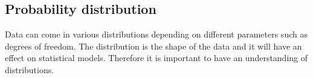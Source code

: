 \subsection{Probability distribution}
Data can come in various distributions depending on different parameters such as degrees of freedom. The distribution is the shape of the data and it will have an effect on statistical models. Therefore it is important to have an understanding of distributions.
\newline